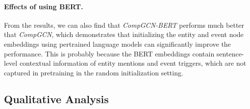\paragraph{Effects of using BERT.}
From the results, we can also find that \emph{CompGCN-BERT} performs much better that \emph{CompGCN}, which demonstrates that initializing the entity and event node embeddings using pertrained language models can significantly improve the performance.
This is probably because the BERT embeddings contain sentence-level contextual information of entity mentions and event triggers, which are not captured in pretraining in the random initialization setting.

\subsection{Qualitative Analysis}

